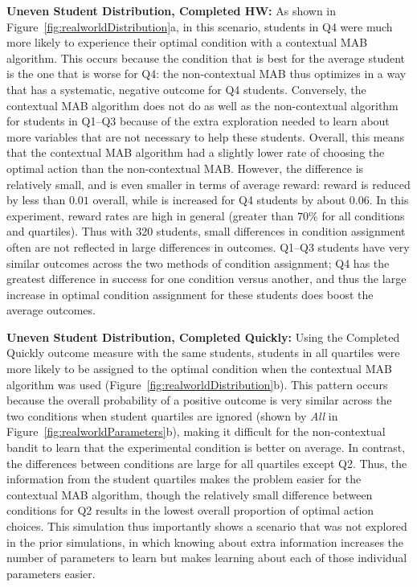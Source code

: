 \textbf{Uneven Student Distribution, Completed HW:} As shown in Figure~\ref{fig:realworldDistribution}a, in this scenario, students in Q4 were much more likely to experience their optimal condition with a contextual MAB algorithm. This occurs because the condition that is best for the average student is the one that is worse for Q4: the non-contextual MAB thus optimizes in a way that has a systematic, negative outcome for Q4 students. Conversely, the contextual MAB algorithm does not do as well as the non-contextual algorithm for students in Q1--Q3 because of the extra exploration needed to learn about more variables that are not necessary to help these students. Overall, this means that the contextual MAB algorithm had a slightly lower rate of choosing the optimal action than the non-contextual MAB. However, the difference is relatively small, and is even smaller in terms of average reward: reward is reduced by less than $0.01$ overall, while is increased for Q4 students by about $0.06$. In this experiment, reward rates are high in general (greater than $70\%$ for all conditions and quartiles). Thus with 320 students, small differences in condition assignment often are not reflected in large differences in outcomes. Q1--Q3 students have very similar outcomes across the two methods of condition assignment; Q4 has the greatest difference in success for one condition versus another, and thus the large increase in optimal condition assignment for these students does boost the average outcomes. 

\textbf{Uneven Student Distribution, Completed Quickly:} Using the Completed Quickly outcome measure with the same students, students in all quartiles were more likely to be assigned to the optimal condition when the contextual MAB algorithm was used (Figure~\ref{fig:realworldDistribution}b). This pattern occurs because the overall probability of a positive outcome is very similar across the two conditions when student quartiles are ignored (shown by \textit{All} in Figure~\ref{fig:realworldParameters}b), making it difficult for the non-contextual bandit to learn that the experimental condition is better on average. In contrast, the differences between conditions are large for all quartiles except Q2. Thus, the information from the student quartiles makes the problem easier for the contextual MAB algorithm, though the relatively small difference between conditions for Q2 results in the lowest overall proportion of optimal action choices. This simulation thus importantly shows a scenario that was not explored in the prior simulations, in which knowing about extra information increases the number of  parameters to learn but makes learning about each of those individual parameters easier.

